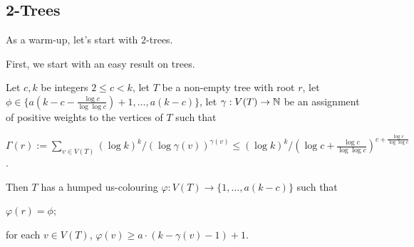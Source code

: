 \documentclass[kpfonts]{patmorin}
\begin{document}
\subsection{2-Trees}

As a warm-up, let's start with $2$-trees.

First, we start with an easy result on trees.

\begin{lem}
Let $c,k$ be integers $2\le c< k$, let $T$ be a non-empty tree with root $r$, let $\phi\in\{a(k-c-\tfrac{\log c}{\log\log c})+1,\ldots,a(k-c)\}$, let $\gamma:V(T)\to\mathbb{N}$ be an assignment of positive weights to the vertices of $T$ such that
\begin{compactenum}[(R1)]
    \item $\Gamma(r):=\sum_{v\in V(T)} (\log k)^k/(\log \gamma(v))^{\gamma(v)} \le (\log k)^k/(\log c+\tfrac{\log c}{\log\log c})^{c+\tfrac{\log c}{\log\log c}}$. \label{total-weight-i}
\end{compactenum}
Then $T$ has a humped us-colouring $\varphi:V(T)\to\{1,\ldots,a(k-c)\}$ such that
\begin{compactenum}[(P1)]
    \item $\varphi(r)=\phi$;
    \item for each $v\in V(T)$, $\varphi(v)\ge a\cdot(k-\gamma(v)-1)+1$.
\end{compactenum}
\end{lem}
\end{document}
